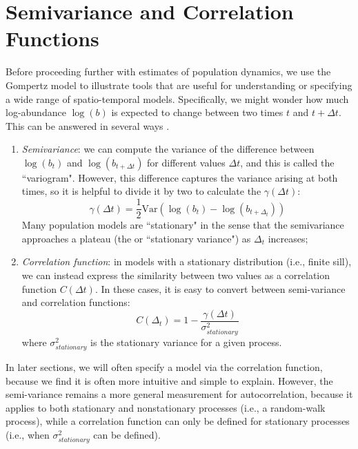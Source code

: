\section{Semivariance and Correlation Functions} \label{sec:Chap3_semivariance}

Before proceeding further with estimates of population dynamics, we use the Gompertz model to illustrate tools that are useful for understanding or specifying a wide range of spatio-temporal models.  Specifically, we might wonder how much log-abundance \( \log(b) \) is expected to change between two times \(t\) and \(t+\Delta t\).  This can be answered in several ways \cite{cressie_statistics_2011}.

\begin{enumerate}
    \item \textit{Semivariance}:  we can compute the variance of the difference between \( \log(b_t) \) and \( \log(b_{t+\Delta t}) \) for different values \(\Delta t\), and this is called the ``variogram".  However, this difference captures the variance arising at both times, so it is helpful to divide it by two to calculate the  \(\gamma(\Delta t)\):
\begin{equation}
    \gamma(\Delta t) = \frac{1}{2} \mathrm{Var}( \log(b_t) - \log(b_{t+\Delta_t}) )
\end{equation}
    Many population models are ``stationary" in the sense that the semivariance approaches a plateau (the  or ``stationary variance") as \( \Delta_t \) increases; 

    \item \textit{Correlation function}: in models with a stationary distribution (i.e., finite sill), we can instead express the similarity between two values as a correlation function \( C(\Delta t) \).  In these cases, it is easy to convert between semi-variance and correlation functions:
\begin{equation}
    C(\Delta_t) = 1 - \frac{\gamma(\Delta t)}{\sigma_{stationary}^2}
\end{equation}
    where \(\sigma_{stationary}^2\) is the stationary variance for a given process.
\end{enumerate}
In later sections, we will often specify a model via the correlation function, because we find it is often more intuitive and simple to explain.  However, the semi-variance remains a more general measurement for autocorrelation, because it applies to both stationary and nonstationary processes (i.e., a random-walk process), while a correlation function can only be defined for stationary processes (i.e., when \(\sigma_{stationary}^2\) can be defined).

